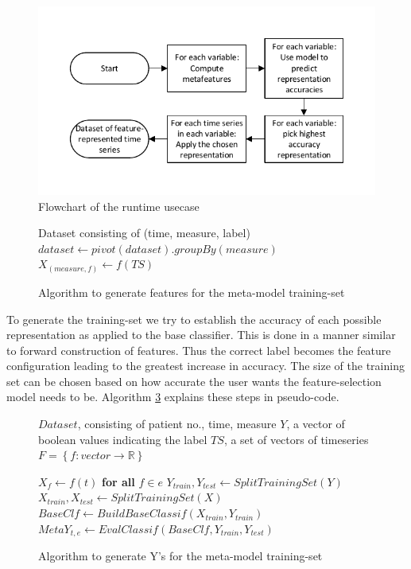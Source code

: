 \documentclass[conference]{IEEEtran}
\begin{document}
\begin{figure}[!t]
\centering
\includegraphics[width=.45\textwidth]{Drawing2.pdf}
\caption{Flowchart of the runtime usecase}
\label{fig_runtime}
\end{figure}

\begin{figure}
  \begin{algorithmic}[1] %
    \REQUIRE Dataset consisting of (time, measure, label)
    \STATE $dataset \leftarrow pivot(dataset).groupBy(measure)$
    \STATE $X_{(measure, f)} \leftarrow f(TS)$
    \ENDFOR
    \ENDFOR
  \end{algorithmic}
  \caption{Algorithm to generate features for the meta-model training-set}\label{gen-meta-xs}
\end{figure}

To generate the training-set we try to establish the accuracy of each possible representation as applied to the base classifier. This is done in a manner similar to forward construction of features. Thus the correct label becomes the feature configuration leading to the greatest increase in accuracy. The size of the training set can be chosen based on how accurate the user wants the feature-selection model needs to be. Algorithm \ref{gen-meta-ys} explains these steps in pseudo-code.

\begin{figure}
  \begin{algorithmic}[1] %
    \REQUIRE $Dataset$, consisting of patient no., time, measure
    \REQUIRE $Y$, a vector of boolean values indicating the label
    \REQUIRE $TS$, a set of vectors of timeseries
    \REQUIRE $F = \left\{ f:vector \rightarrow \mathbb{R}\right\} $

    \STATE $X_{f} \leftarrow f(t)$ \textbf{for all} $f \in e$
    \STATE $Y_{train}, Y_{test} \leftarrow SplitTrainingSet(Y)$
    \STATE $X_{train}, X_{test} \leftarrow SplitTrainingSet(X)$
    \STATE $BaseClf \leftarrow BuildBaseClassif(X_{train}, Y_{train})$
    \STATE $MetaY_{t, e} \leftarrow EvalClassif(BaseClf, Y_{train}, Y_{test})$
    \ENDFOR
    \ENDFOR
  \end{algorithmic}
  \caption{Algorithm to generate Y's for the meta-model training-set}\label{gen-meta-ys}
\end{figure}
\end{document}
